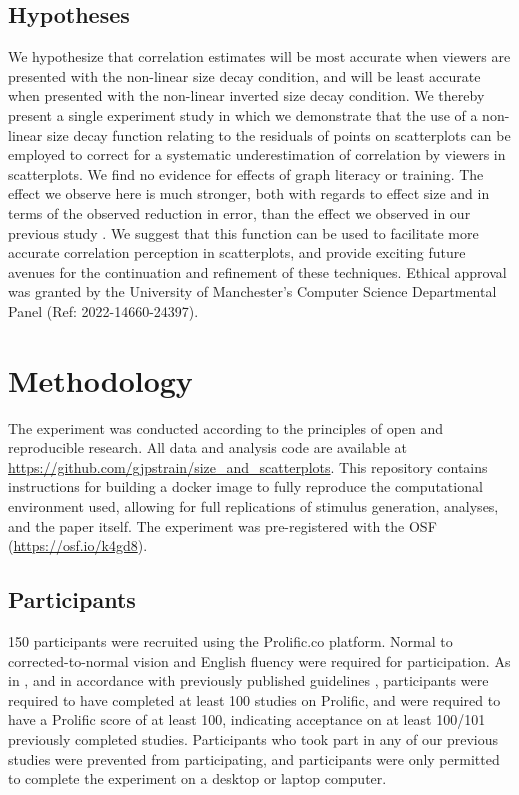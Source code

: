\documentclass{vgtc}                          %
\begin{document}
\hypertarget{hypotheses}{%
\subsection{Hypotheses}\label{hypotheses}}

We hypothesize that correlation estimates will be most accurate when
viewers are presented with the non-linear size decay condition, and will be
least accurate when presented with the non-linear inverted size decay condition.
We thereby present a single experiment study in which we demonstrate that the use of
a non-linear size decay function relating to the residuals of points on scatterplots
can be employed to correct for a systematic underestimation of correlation by
viewers in scatterplots. We find no evidence for effects of graph literacy or training.
The effect we observe here is much stronger, both
with regards to effect size and in terms of the observed reduction in error, than the
effect we observed in our previous study \cite{strain_2023}. We suggest that this
function can be used to facilitate more accurate correlation
perception in scatterplots, and provide exciting future avenues for the continuation
and refinement of these techniques. Ethical approval was granted by the University
of Manchester's Computer Science Departmental Panel (Ref: 2022-14660-24397).

\hypertarget{methodology}{%
\section{Methodology}\label{methodology}}

The experiment was conducted according to the principles of open and reproducible research.
All data and analysis code are available at \url{https://github.com/gjpstrain/size_and_scatterplots}.
This repository contains instructions for building a docker image to fully
reproduce the computational environment used, allowing for full replications
of stimulus generation, analyses, and the paper itself. The experiment was
pre-registered with the OSF (\url{https://osf.io/k4gd8}).

\hypertarget{participants}{%
\subsection{Participants}\label{participants}}

150 participants were recruited using the Prolific.co platform. Normal to
corrected-to-normal vision and English fluency were required for participation. As in
\cite{strain_2023}, and in accordance with previously published guidelines \cite{peer_2021},
participants were required to have completed at least 100 studies on Prolific, and were
required to have a Prolific score of at least 100, indicating acceptance on at least
100/101 previously completed studies. Participants who took part in any of our
previous studies were prevented from participating, and participants were only
permitted to complete the experiment on a desktop or laptop computer.
\end{document}
